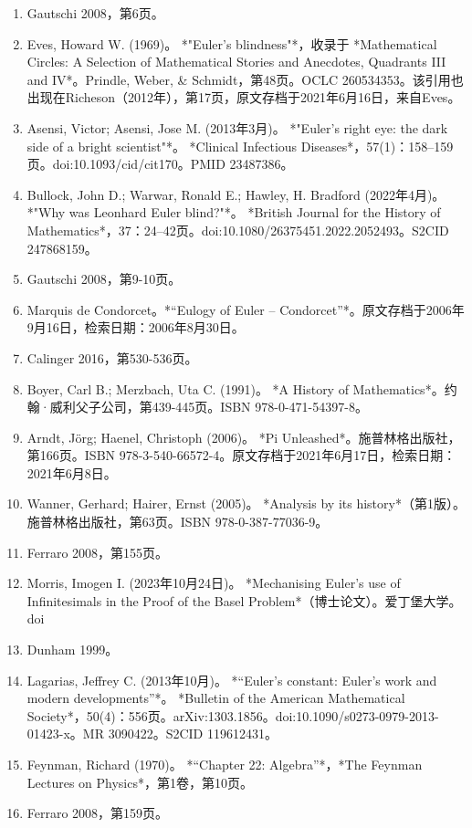 \begin{enumerate}
\item Gautschi 2008，第6页。
\item Eves, Howard W. (1969)。 *"Euler's blindness"*，收录于 *Mathematical Circles: A Selection of Mathematical Stories and Anecdotes, Quadrants III and IV*。Prindle, Weber, & Schmidt，第48页。OCLC 260534353。该引用也出现在Richeson（2012年），第17页，原文存档于2021年6月16日，来自Eves。
\item Asensi, Victor; Asensi, Jose M. (2013年3月)。 *"Euler's right eye: the dark side of a bright scientist"*。 *Clinical Infectious Diseases*，57(1)：158–159页。doi:10.1093/cid/cit170。PMID 23487386。
\item Bullock, John D.; Warwar, Ronald E.; Hawley, H. Bradford (2022年4月)。 *"Why was Leonhard Euler blind?"*。 *British Journal for the History of Mathematics*，37：24–42页。doi:10.1080/26375451.2022.2052493。S2CID 247868159。
\item Gautschi 2008，第9-10页。
\item Marquis de Condorcet。*“Eulogy of Euler – Condorcet”*。原文存档于2006年9月16日，检索日期：2006年8月30日。
\item Calinger 2016，第530-536页。
\item Boyer, Carl B.; Merzbach, Uta C. (1991)。 *A History of Mathematics*。约翰·威利父子公司，第439-445页。ISBN 978-0-471-54397-8。
\item Arndt, Jörg; Haenel, Christoph (2006)。 *Pi Unleashed*。施普林格出版社，第166页。ISBN 978-3-540-66572-4。原文存档于2021年6月17日，检索日期：2021年6月8日。
\item Wanner, Gerhard; Hairer, Ernst (2005)。 *Analysis by its history*（第1版）。施普林格出版社，第63页。ISBN 978-0-387-77036-9。
\item Ferraro 2008，第155页。
\item Morris, Imogen I. (2023年10月24日)。 *Mechanising Euler's use of Infinitesimals in the Proof of the Basel Problem*（博士论文）。爱丁堡大学。doi
\item Dunham 1999。
\item Lagarias, Jeffrey C. (2013年10月)。 *“Euler's constant: Euler's work and modern developments”*。 *Bulletin of the American Mathematical Society*，50(4)：556页。arXiv:1303.1856。doi:10.1090/s0273-0979-2013-01423-x。MR 3090422。S2CID 119612431。
\item Feynman, Richard (1970)。 *“Chapter 22: Algebra”*，*The Feynman Lectures on Physics*，第1卷，第10页。
\item Ferraro 2008，第159页。




\end{enumerate}
